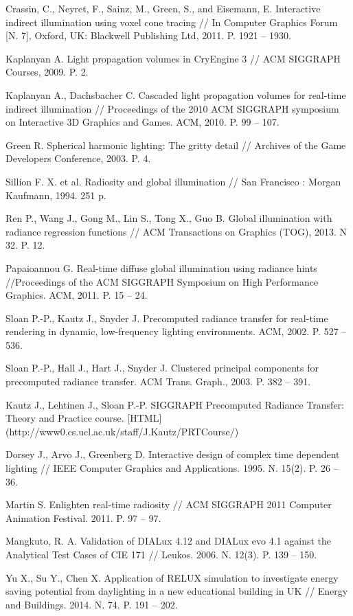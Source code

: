 \documentclass[oneside,final,12pt, a4paper]{extreport}
\begin{document}
\begin{thebibliography}{00}
 Crassin, C., Neyret, F., Sainz, M., Green, S., and Eisemann, E. Interactive indirect illumination using voxel cone tracing // In Computer Graphics Forum [N. 7], Oxford, UK: Blackwell Publishing Ltd, 2011. P. 1921 -- 1930.

 Kaplanyan A. Light propagation volumes in CryEngine 3 // ACM SIGGRAPH Courses, 2009. P. 2.

 Kaplanyan A., Dachsbacher C. Cascaded light propagation volumes for real-time indirect illumination // Proceedings of the 2010 ACM SIGGRAPH symposium on Interactive 3D Graphics and Games. ACM, 2010. P. 99 -- 107.

 Green R. Spherical harmonic lighting: The gritty detail // Archives of the Game Developers Conference, 2003. P. 4.

 Sillion F. X. et al. Radiosity and global illumination // San Francisco : Morgan Kaufmann, 1994. 251 p.

 Ren P., Wang J., Gong M., Lin S., Tong X., Guo B. Global illumination with radiance regression functions // ACM Transactions on Graphics (TOG), 2013. N 32. P. 12.

 Papaioannou G. Real-time diffuse global illumination using radiance hints //Proceedings of the ACM SIGGRAPH Symposium on High Performance Graphics. ACM, 2011. P. 15 -- 24.

 Sloan P.-P., Kautz J., Snyder J. Precomputed radiance transfer for real-time rendering in dynamic, low-frequency lighting environments. ACM, 2002. P. 527 -- 536.

 Sloan P.-P., Hall J., Hart J., Snyder J. Clustered principal components for precomputed radiance transfer. ACM Trans. Graph., 2003. P. 382 -- 391.

 Kautz J., Lehtinen J., Sloan P.-P. SIGGRAPH Precomputed Radiance Transfer: Theory and Practice course. [HTML] (http://www0.cs.ucl.ac.uk/staff/J.Kautz/PRTCourse/)

 Dorsey J., Arvo J., Greenberg D. Interactive design of complex time dependent lighting // IEEE Computer Graphics and Applications. 1995. N. 15(2). P. 26 -- 36.

 Martin S.  Enlighten real-time radiosity // ACM SIGGRAPH 2011 Computer Animation Festival. 2011. P. 97 -- 97.

 Mangkuto, R. A. Validation of DIALux 4.12 and DIALux evo 4.1 against the Analytical Test Cases of CIE 171 // Leukos. 2006. N. 12(3). P. 139 -- 150.

 Yu X., Su Y., Chen X. Application of RELUX simulation to investigate energy saving potential from daylighting in a new educational building in UK // Energy and Buildings. 2014. N. 74. P. 191 -- 202.

\end{thebibliography}
\end{document}
